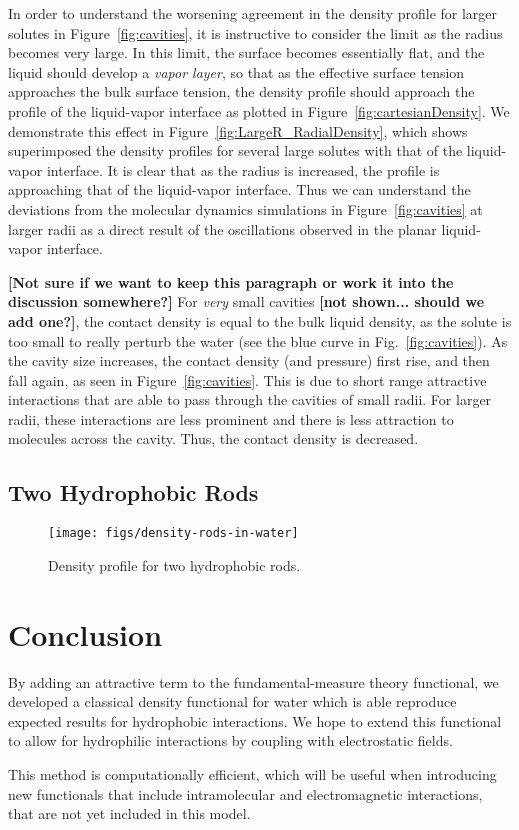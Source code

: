 \documentclass[letterpaper,twocolumn,amsmath,amssymb,prb]{revtex4-1}
\newcommand{\red}[1]{{\bf \color{red} #1}}
\newcommand{\fixme}[1]{\red{[#1]}}
\begin{document}
In order to understand the worsening agreement in the density profile
for larger solutes in Figure~\ref{fig:cavities}, it is instructive to
consider the limit as the radius becomes very large.  In this limit,
the surface becomes essentially flat, and the liquid should develop a
\emph{vapor layer}, so that as the effective surface tension
approaches the bulk surface tension, the density profile should
approach the profile of the liquid-vapor interface as plotted in
Figure~\ref{fig:cartesianDensity}.  We demonstrate this effect in
Figure~\ref{fig:LargeR_RadialDensity}, which shows superimposed the
density profiles for several large solutes with that of the
liquid-vapor interface.  It is clear that as the radius is increased,
the profile is approaching that of the liquid-vapor interface.  Thus
we can understand the deviations from the molecular dynamics
simulations in Figure~\ref{fig:cavities} at larger radii as a direct
result of the oscillations observed in the planar liquid-vapor
interface.

\fixme{Not sure if we want to keep this paragraph or work it into the
  discussion somewhere?} For \emph{very} small cavities \fixme{not
  shown... should we add one?}, the contact density is equal to the
bulk liquid density, as the solute is too small to really perturb the
water (see the blue curve in Fig.~\ref{fig:cavities}).  As the cavity
size increases, the contact density (and pressure) first rise, and
then fall again, as seen in Figure~\ref{fig:cavities}.  This is due to
short range attractive interactions that are able to pass through the
cavities of small radii.  For larger radii, these interactions are
less prominent and there is less attraction to molecules across the
cavity.  Thus, the contact density is decreased.

\subsection{Two Hydrophobic Rods}

\begin{figure}
\begin{center}
\texttt{[image: figs/density-rods-in-water]}
\end{center}
\caption{ Density profile for two hydrophobic rods.}
\label{fig:density-rods}
\end{figure}

\section{Conclusion}
By adding an attractive term to the fundamental-measure theory
functional, we developed a classical density functional for water
which is able reproduce expected results for hydrophobic
interactions.  We hope to extend this functional to allow for
hydrophilic interactions by coupling with electrostatic fields.

This method is computationally efficient, which will be useful when
introducing new functionals that include intramolecular and electromagnetic
interactions, that are not yet included in this model.

\end{document}
